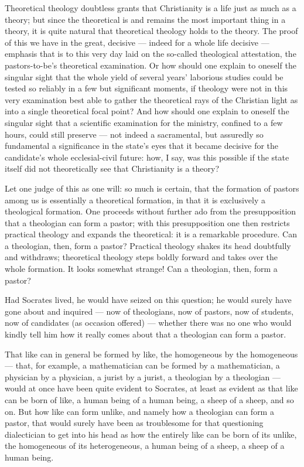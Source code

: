 \documentclass[12pt,a4paper]{book}
\begin{document}
Theoretical theology doubtless grants that Christianity is a life just as much as a theory; but
since the theoretical is and remains the most important thing in a theory, it is quite natural
that theoretical theology holds to the theory. The proof of this we have in the great, decisive
--- indeed for a whole life decisive --- emphasis that is to this very day laid on the so-called
theological attestation, the pastors-to-be's theoretical examination. Or how should one explain to
oneself the singular sight that the whole yield of several years' laborious studies could be
tested so reliably in a few but significant moments, if theology were not in this very examination
best able to gather the theoretical rays of the Christian light as into a single theoretical focal
point? And how should one explain to oneself the singular sight that a scientific examination for
the ministry, confined to a few hours, could still preserve --- not indeed a sacramental, but
assuredly so fundamental a significance in the state's eyes that it became decisive for the
candidate's
whole ecclesial-civil future: how, I say, was this possible if the state itself did not
theoretically see that Christianity is a theory?

Let one judge of this as one will: so much is certain, that the formation of pastors among us is
essentially a theoretical formation, in that it is exclusively a theological formation. One
proceeds without further ado from the presupposition that a theologian can form a pastor; with
this presupposition one then restricts practical theology and expands the theoretical: it is a
remarkable procedure. Can a theologian, then, form a pastor? Practical theology shakes its head
doubtfully and withdraws; theoretical theology steps boldly forward and takes over the whole
formation. It looks somewhat strange! Can a theologian, then, form a pastor?

Had Socrates lived, he would have seized on this question; he would surely have gone about and
inquired --- now of theologians, now of pastors, now of students, now of candidates (as occasion
offered) --- whether there was no one who would kindly tell him how it really comes about that a
theologian can form a pastor.

That like can in general be formed by like, the homogeneous by the homogeneous --- that, for
example, a mathematician can be formed by a mathematician, a physician by a physician, a jurist
by a jurist, a theologian by a theologian --- would at once have been quite evident to Socrates,
at least as evident as that like can be born of like, a human being of a human being, a sheep of
a sheep, and so on. But how like can form unlike, and namely how a theologian can form a pastor,
that would surely have been as troublesome for that questioning dialectician to get into his head
as how the entirely like can be born of its unlike, the homogeneous of its heterogeneous, a human
being of a sheep, a sheep of a human being.
\end{document}
